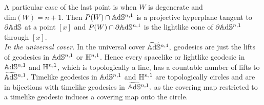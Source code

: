 A particular case of the last point is when $W$ is degenerate and $\text{dim}(W)=n+1.$ Then $P(W)\cap \mathbb{A}\mathrm{d}\mathbb{S}^{n,1}$ is a projective hyperplane tangent to $\partial\mathbb{A}\mathrm{d}\mathbb{S}$ at a point $[x]$ and $P(W)\cap \partial\mathbb{A}\mathrm{d}\mathbb{S}^{n,1}$ is the lightlike cone of $\partial\mathbb{A}\mathrm{d}\mathbb{S}^{n,1}$ through $[x]$.\\

\textit{In the universal cover.} In the universal cover $\widetilde{\mathbb{A}\mathrm{d}\mathbb{S}}{}^{n,1},$ geodesics are just the lifts of geodesics in $\mathbb{A}\mathrm{d}\mathbb{S}^{n,1}$ or $\mathbb{H}^{n,1}$. Hence every spacelike or lightlike geodesic in $\mathbb{A}\mathrm{d}\mathbb{S}^{n,1}$ and $\mathbb{H}^{n,1}$, which is topologically a line, has a countable number of lifts to $\widetilde{\mathbb{A}\mathrm{d}\mathbb{S}}{}^{n,1}$. Timelike geodesics in $\mathbb{A}\mathrm{d}\mathbb{S}^{n,1}$ and $\mathbb{H}^{n,1}$ are topologically circles and are in bijections with timelike geodesics in $\widetilde{\mathbb{A}\mathrm{d}\mathbb{S}}{}^{n,1},$ as the covering map restricted to a timelike geodesic induces a covering map onto the circle. %

